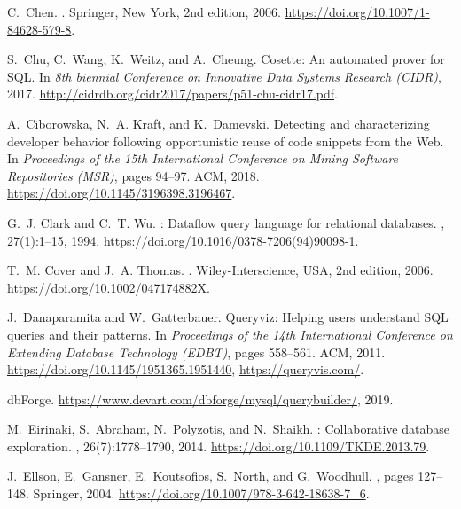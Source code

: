 \documentclass[letterpaper,11pt]{article}
\begin{document}
\begin{thebibliography}{100}
C.~Chen.
.
\newblock Springer, New York, 2nd edition, 2006.
\newblock \url{https://doi.org/10.1007/1-84628-579-8}.

S.~Chu, C.~Wang, K.~Weitz, and A.~Cheung.
\newblock Cosette: An automated prover for {SQL}.
\newblock In {\em 8th biennial Conference on Innovative Data Systems Research
  ({CIDR})}, 2017.
\newblock \url{http://cidrdb.org/cidr2017/papers/p51-chu-cidr17.pdf}.

A.~Ciborowska, N.~A. Kraft, and K.~Damevski.
\newblock Detecting and characterizing developer behavior following
  opportunistic reuse of code snippets from the {Web}.
\newblock In {\em Proceedings of the 15th International Conference on Mining
  Software Repositories (MSR)}, pages 94--97. ACM, 2018.
\newblock \url{https://doi.org/10.1145/3196398.3196467}.

G.~J. Clark and C.~T. Wu.
: Dataflow query language for relational databases.
, 27(1):1--15, 1994.
\newblock \url{https://doi.org/10.1016/0378-7206(94)90098-1}.

T.~M. Cover and J.~A. Thomas.
.
\newblock Wiley-Interscience, USA, 2nd edition, 2006.
\newblock \url{https://doi.org/10.1002/047174882X}.

J.~Danaparamita and W.~Gatterbauer.
\newblock Queryviz: Helping users understand {SQL} queries and their patterns.
\newblock In {\em Proceedings of the 14th International Conference on Extending
  Database Technology ({EDBT})}, pages 558--561. ACM, 2011.
\newblock \url{https://doi.org/10.1145/1951365.1951440},
  \url{https://queryvis.com/}.

{dbForge}.
\newblock \url{https://www.devart.com/dbforge/mysql/querybuilder/}, 2019.

M.~Eirinaki, S.~Abraham, N.~Polyzotis, and N.~Shaikh.
: Collaborative database exploration.
,
  26(7):1778--1790, 2014.
\newblock \url{https://doi.org/10.1109/TKDE.2013.79}.

J.~Ellson, E.~Gansner, E.~Koutsofios, S.~North, and G.~Woodhull.
, pages 127--148.
\newblock Springer, 2004.
\newblock \url{https://doi.org/10.1007/978-3-642-18638-7_6}.


\end{thebibliography}
\end{document}
